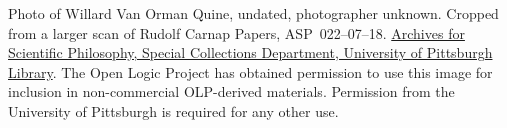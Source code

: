 Photo of Willard Van Orman Quine, undated, photographer
unknown. Cropped from a larger scan of Rudolf Carnap Papers, ASP~022--07--18.
\href{http://www.library.pitt.edu/special-collections}{Archives
for Scientific Philosophy, Special Collections Department, University
of Pittsburgh Library}. The Open Logic Project has obtained permission
to use this image for inclusion in non-commercial OLP-derived
materials. Permission from the University of Pittsburgh is required
for any other use.
